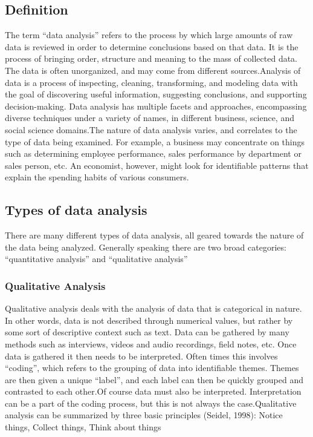 \documentclass[a4paper,12pt,oneside]{report}
\begin{document}
{\subsection{Definition}
{      The term “data analysis” refers to the process by which large amounts of raw data is reviewed in order to determine conclusions based on that data. It is the process of bringing order, structure and meaning to the mass of collected data. The data is often unorganized, and may come from different sources.Analysis of data is a process of inspecting, cleaning, transforming, and modeling data with the goal of discovering useful information, suggesting conclusions, and supporting decision-making. Data analysis has multiple facets and approaches, encompassing diverse techniques under a variety of names, in different business, science, and social science domains.The nature of data analysis varies, and correlates to the type of data being examined. For example, a business may concentrate on things such as determining employee performance, sales performance by department or sales person, etc. An economist, however, might look for identifiable patterns that explain the spending habits of various consumers.}
\subsection{Types of data analysis }
{     There are many different types of data analysis, all geared towards the nature of the data being analyzed. Generally speaking there are two broad categories: “quantitative analysis” and “qualitative analysis”}
\subsubsection{Qualitative Analysis}
{    Qualitative analysis deals with the analysis of data that is categorical in nature. In other words, data is not described through numerical values, but rather by some sort of descriptive context such as text. Data can be gathered by many methods such as interviews, videos and audio recordings, field notes, etc.
Once data is gathered it then needs to be interpreted. Often times this involves “coding”, which refers to the grouping of data into identifiable themes. Themes are then given a unique “label”, and each label can then be quickly grouped and contrasted to each other.Of course data must also be interpreted. Interpretation can be a part of the coding process, but this is not always the case.Qualitative analysis can be summarized by three basic principles (Seidel, 1998):
Notice things, Collect things, Think about things}
}
\end{document}
